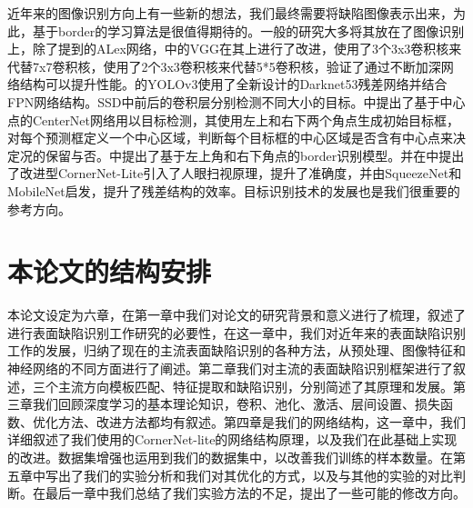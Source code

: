 近年来的图像识别方向上有一些新的想法，我们最终需要将缺陷图像表示出来，为此，基于border的学习算法是很值得期待的。一般的研究大多将其放在了图像识别上，除了\cite{NIPS2012_4824}提到的ALex网络，\cite{Simonyan15}中的VGG在其上进行了改进，使用了3个3x3卷积核来代替7x7卷积核，使用了2个3x3卷积核来代替5*5卷积核，验证了通过不断加深网络结构可以提升性能。\cite{Redmon2018YOLOv3AI}的YOLOv3使用了全新设计的Darknet53残差网络并结合FPN网络结构。SSD中前后的卷积层分别检测不同大小的目标。\cite{duan2019centernet}中提出了基于中心点的CenterNet网络用以目标检测，其使用左上和右下两个角点生成初始目标框，对每个预测框定义一个中心区域，判断每个目标框的中心区域是否含有中心点来决定况的保留与否。\cite{DBLP:journals/corr/abs-1808-01244}中提出了基于左上角和右下角点的border识别模型。并在\cite{DBLP:journals/corr/abs-1904-08900}中提出了改进型CornerNet-Lite引入了人眼扫视原理，提升了准确度，并由SqueezeNet\cite{DBLP:journals/corr/IandolaMAHDK16}和MobileNet\cite{DBLP:journals/corr/HowardZCKWWAA17}启发，提升了残差结构的效率。目标识别技术的发展也是我们很重要的参考方向。

\section{本论文的结构安排}
本论文设定为六章，在第一章中我们对论文的研究背景和意义进行了梳理，叙述了进行表面缺陷识别工作研究的必要性，在这一章中，我们对近年来的表面缺陷识别工作的发展，归纳了现在的主流表面缺陷识别的各种方法，从预处理、图像特征和神经网络的不同方面进行了阐述。第二章我们对主流的表面缺陷识别框架进行了叙述，三个主流方向模板匹配、特征提取和缺陷识别，分别简述了其原理和发展。第三章我们回顾深度学习的基本理论知识，卷积、池化、激活、层间设置、损失函数、优化方法、改进方法都均有叙述。第四章是我们的网络结构，这一章中，我们详细叙述了我们使用的CornerNet-lite的网络结构原理，以及我们在此基础上实现的改进。数据集增强也运用到我们的数据集中，以改善我们训练的样本数量。在第五章中写出了我们的实验分析和我们对其优化的方式，以及与其他的实验的对比判断。在最后一章中我们总结了我们实验方法的不足，提出了一些可能的修改方向。

